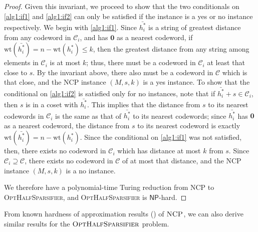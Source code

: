 \documentclass{article}
\newcommand{\NP}{\mathsf{NP}}
\newcommand{\NCP}{\textsc{NCP}}
\newcommand{\OptHalfSparsifier}{\textsc{Opt\-Half\-Sparsifier}}
\newcommand{\calC}{\mathcal{C}}
\newcommand{\wt}{\text{wt}}
\begin{document}
\begin{proof}
Given this invariant, we proceed to show that the two conditionals on \autoref{alg1:if1} and \autoref{alg1:if2} can only be satisfied if the instance is a yes or no instance respectively. We begin with \autoref{alg1:if1}. Since $\bar{h^*_i}$ is a string of greatest distance from any codeword in $\calC_i$, and has $\mathbf{0}$ as a nearest codeword, if $\wt(\bar{h^*_i}) = n - \wt(h_i^*) \leq k$, then the greatest distance from any string among elements in $\calC_i$ is at most $k$; thus, there must be a codeword in $\calC_i$ at least that close to $s$. By the invariant above, there also must be a codeword in $\calC$ which is that close, and the {\NCP} instance $(M, s, k)$ is a yes instance. To show that the conditional on \autoref{alg1:if2} is satisfied only for no instances, note that if $\bar{h_i^*} + s \in \calC_i$, then $s$ is in a coset with $\bar{h_i^*}$. This implies that the distance from $s$ to its nearest codewords in $\calC_i$ is the same as that of $\bar{h_i^*}$ to its nearest codewords; since $\bar{h_i^*}$ has $\mathbf{0}$ as a nearest codeword, the distance from $s$ to its nearest codeword is exactly $\wt(\bar{h_i^*}) = n - \wt(h_i^*)$. Since the conditional on \autoref{alg1:if1} was not satisfied, then, there exists no codeword in $\calC_i$ which has distance at most $k$ from $s$. Since $\calC_i \supseteq \calC$, there exists no codeword in $\calC$ of at most that distance, and the {\NCP} instance $(M, s, k)$ is a no instance.

We therefore have a polynomial-time Turing reduction from  {\NCP} to {\OptHalfSparsifier}, and {\OptHalfSparsifier} is $\NP$-hard.
\end{proof}

From known hardness of approximation results (\cite{bhattiproluGLR2025})  of $\NCP$, we can also derive similar results for the $\OptHalfSparsifier$ problem.
\end{document}
